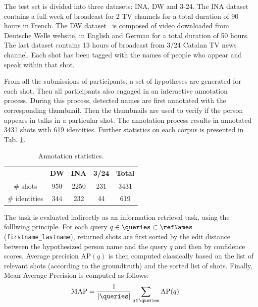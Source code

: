  The test set is divided into three datasets: INA, DW and 3-24. The INA dataset contains a full week of broadcast for 2 TV channels for a total duration of 90 hours in French. The DW dataset~\cite{EUMSSI} is composed of video downloaded from Deutsche Welle website, in English and German for a total duration of 50 hours. The last dataset contains 13 hours of broadcast from 3/24 Catalan TV news channel. Each shot has been tagged with the names of people who appear and speak within that shot.

From all the submissions of participants, a set of hypotheses are generated for each shot. Then all participants also engaged in an interactive annotation process. During this process, detected names are first annotated with the corresponding thumbnail. Then the thumbnails are used to verify if the person appears in talks in a particular shot. The annotation process results in annotated 3431 shots with 619 identities. Further statistics on each corpus is presented in Tab. \ref{tab:stats}.

\begin{table}[tb]
\centering
\begin{tabular}{c|c|c|c|c|}
\cline{2-5}
    						   		& DW  	& INA 	& 3/24  & Total\\ \hline
 \multicolumn{1}{|c|}{\# shots} 		& 950	& 2250  & 231 & 3431\\ \hline

 \multicolumn{1}{|c|}{\# identities} 	& 344	& 232   & 44 & 619 \\ \hline
								
\end{tabular}
\vspace*{-2mm}
\caption{Annotation statistics.}
\vspace*{-2mm}
\label{tab:stats}
\end{table}



 The task is evaluated indirectly as an information retrieval task, using the folllwing principle.
%
For each query $q \in \queries \subset \refNames$ (\texttt{first\-name\_lastname}), returned shots are first sorted by the edit distance between the hypothesized person name and the query $q$ and then by confidence scores.
Average precision $\text{AP}(q)$ is then computed classically based on the list of relevant shots (according to the groundtruth) and the sorted list of shots. Finally, Mean Average Precision is computed as follows:
\begin{align}
            \text{MAP} & = \frac{1}{|\queries|} \sum_{q \in \queries} \text{AP}(q) \nonumber
\end{align}

